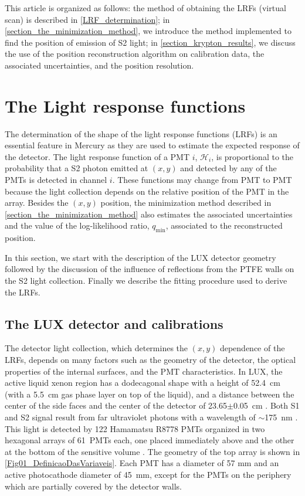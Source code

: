 \documentclass[a4paper,11pt]{article}
\begin{document}
This article is organized as follows: the method of obtaining the LRFs (virtual scan) is described in \cref{LRF_determination}; in \cref{section_the_minimization_method}, we introduce the method implemented to find the position of emission of S2 light; in  \cref{section_krypton_results}, we discuss the use of the position reconstruction algorithm on calibration data, the associated uncertainties, and the position resolution. 

\section{The Light response functions\label{section_The_Light_Response_Functions}\label{section_position_uncertainties}\label{LRF_determination}}

The determination of the shape of the light response functions (LRFs) is an essential feature in Mercury as they are used to estimate the expected response of the detector. The light response function of a PMT $i$, ${\mathcal H}_i$, is proportional to the probability that a S2 photon emitted at $(x,y)$ and detected by any of the PMTs is detected in channel $i$. These functions may change from PMT to PMT because the light collection depends on the relative position of the PMT in the array.  Besides the $(x, y)$ position, the minimization method described in   \cref{section_the_minimization_method} also estimates the associated uncertainties  and the value of the log-likelihood ratio, $q_{\mathrm{min}}$, associated to the reconstructed position.

In this section, we start with the description of the LUX detector geometry followed by the discussion of the
influence of reflections from the PTFE walls on the S2 light collection. Finally we describe the fitting procedure used to derive the LRFs.

\subsection{The LUX detector and calibrations\label{section_LUX_detector}}

The detector light collection, which determines the $(x, y)$ dependence of the LRFs, depends on many factors such as the geometry of the detector, the optical properties of the internal surfaces, and the PMT characteristics. In LUX, the active liquid xenon region has a dodecagonal shape with a height of 52.4~cm (with a 5.5~cm gas phase layer on top of the liquid), and a distance between the center of the side faces and the center of the detector of 23.65$\pm$0.05~cm \cite{LUX_2013NIM}. Both S1 and S2 signal result from far ultraviolet photons with a wavelength of $\sim$175~nm \cite{Jortner1965, FUJII2015293}. This light is detected by 122 Hamamatsu R8778 PMTs organized in two hexagonal arrays of 61~PMTs each, one placed immediately above and the other at the bottom of the sensitive volume \cite{LUX2013_PMTs}. The geometry of the top array is shown in  \cref{Fig01_DefinicaoDasVariaveis}. Each PMT has a diameter of 57 mm and an active photocathode diameter of 45~mm, except for the PMTs on the periphery which are partially covered by the detector walls. 
\end{document}
